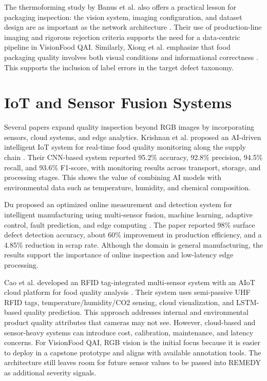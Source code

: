 \documentclass[12pt,a4paper]{report}
\newcommand{\shorttitle}{VisionFood QAI}
\begin{document}
The thermoforming study by Banus et al. also offers a practical lesson for packaging inspection: the vision system, imaging configuration, and dataset design are as important as the network architecture \cite{banus2021thermoforming}. Their use of production-line imaging and rigorous rejection criteria supports the need for a data-centric pipeline in \shorttitle. Similarly, Xiong et al. emphasize that food packaging quality involves both visual conditions and informational correctness \cite{xiong2024artifact}. This supports the inclusion of label errors in the target defect taxonomy.

\section{IoT and Sensor Fusion Systems}
\label{sec:iot-sensor-fusion}

Several papers expand quality inspection beyond RGB images by incorporating sensors, cloud systems, and edge analytics. Krishnan et al. proposed an AI-driven intelligent IoT system for real-time food quality monitoring along the supply chain \cite{krishnan2024aiot}. Their CNN-based system reported 95.2\% accuracy, 92.8\% precision, 94.5\% recall, and 93.6\% F1-score, with monitoring results across transport, storage, and processing stages. This shows the value of combining AI models with environmental data such as temperature, humidity, and chemical composition.

Du proposed an optimized online measurement and detection system for intelligent manufacturing using multi-sensor fusion, machine learning, adaptive control, fault prediction, and edge computing \cite{du2025online}. The paper reported 98\% surface defect detection accuracy, about 60\% improvement in production efficiency, and a 4.85\% reduction in scrap rate. Although the domain is general manufacturing, the results support the importance of online inspection and low-latency edge processing.

Cao et al. developed an RFID tag-integrated multi-sensor system with an AIoT cloud platform for food quality analysis \cite{cao2025rfid}. Their system uses semi-passive UHF RFID tags, temperature/humidity/CO2 sensing, cloud visualization, and LSTM-based quality prediction. This approach addresses internal and environmental product quality attributes that cameras may not see. However, cloud-based and sensor-heavy systems can introduce cost, calibration, maintenance, and latency concerns. For \shorttitle, RGB vision is the initial focus because it is easier to deploy in a capstone prototype and aligns with available annotation tools. The architecture still leaves room for future sensor values to be passed into REMEDY as additional severity signals.
\end{document}

